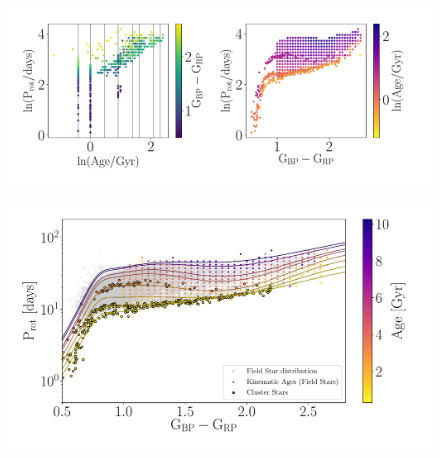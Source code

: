 \begin{figure}
\caption{
}
  \centering \includegraphics[width=1\textwidth]{gp_fit_data_multi-panel}
\end{figure}

\begin{figure}
\caption{
}
  \centering \includegraphics[width=1\textwidth]{gp_fit}
\end{figure}
